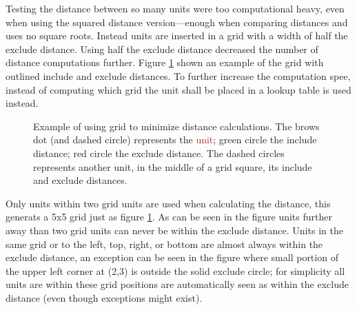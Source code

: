 Testing the distance between so many units were too computational heavy, even when using the squared distance version—enough when comparing distances and uses no square roots. Instead units are inserted in a grid with a width of half the exclude distance. Using half the exclude distance decreased the number of distance computations further. Figure \ref{fig:player_squad_group_grid} shown an example of the grid with outlined include and exclude distances. To further increase the computation spee, instead of computing which grid the unit shall be placed in a lookup table is used instead.

\begin{figure}[htb]
\centering
{}
\caption{Example of using grid to minimize distance calculations. The brows dot (and dashed circle) represents the \textcolor{Brown}{unit}; green circle the \textcolor{OliveGreen}{include distance}; red circle the \textcolor{BrickRed}{exclude distance}. The dashed circles represents another unit, in the middle of a grid square, its include and exclude distances.}
\label{fig:player_squad_group_grid}
\end{figure}

Only units within two grid units are used when calculating the distance, this generats a 5x5 grid just as figure \ref{fig:player_squad_group_grid}. As can be seen in the figure units further away than two grid units can never be within the exclude distance. Units in the same grid or to the left, top, right, or bottom are almost always within the exclude distance, an exception can be seen in the figure where small portion of the upper left corner at (2,3) is outside the solid exclude circle; for simplicity all units are within these grid positions are automatically seen as within the exclude distance (even though exceptions might exist).

